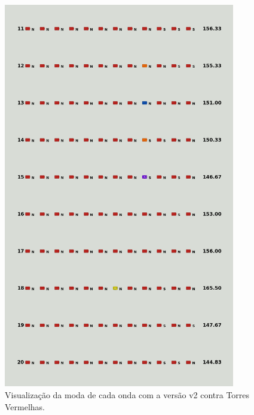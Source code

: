 \begin{figure}[H]
  \centering
  \includegraphics[width=0.9\textwidth]{figuras/td/td_allred_ai_mode_2_2.png}
  \caption{Visualização da moda de cada onda com a versão v2 contra Torres Vermelhas.}
  \label{fig:td-moda-red-2-2}
\end{figure}

